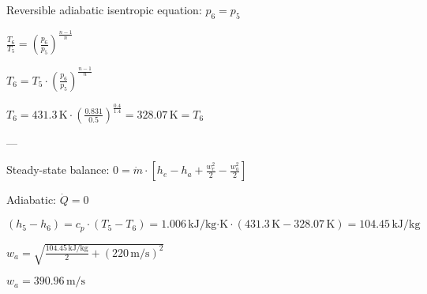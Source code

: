 Reversible adiabatic isentropic equation:  
\( p_6 = p_5 \)  

\( \frac{T_6}{T_5} = \left( \frac{p_6}{p_5} \right)^{\frac{n-1}{n}} \)  

\( T_6 = T_5 \cdot \left( \frac{p_6}{p_5} \right)^{\frac{n-1}{n}} \)  

\( T_6 = 431.3 \, \text{K} \cdot \left( \frac{0.831}{0.5} \right)^{\frac{0.4}{1.4}} = 328.07 \, \text{K} = T_6 \)  

---

Steady-state balance:  
\( 0 = \dot{m} \cdot \left[ h_e - h_a + \frac{w_e^2}{2} - \frac{w_a^2}{2} \right] \)  

Adiabatic: \( \dot{Q} = 0 \)  

\( (h_5 - h_6) = c_p \cdot (T_5 - T_6) = 1.006 \, \text{kJ/kg·K} \cdot (431.3 \, \text{K} - 328.07 \, \text{K}) = 104.45 \, \text{kJ/kg} \)  

\( w_a = \sqrt{\frac{104.45 \, \text{kJ/kg}}{2} + (220 \, \text{m/s})^2} \)  

\( w_a = 390.96 \, \text{m/s} \)